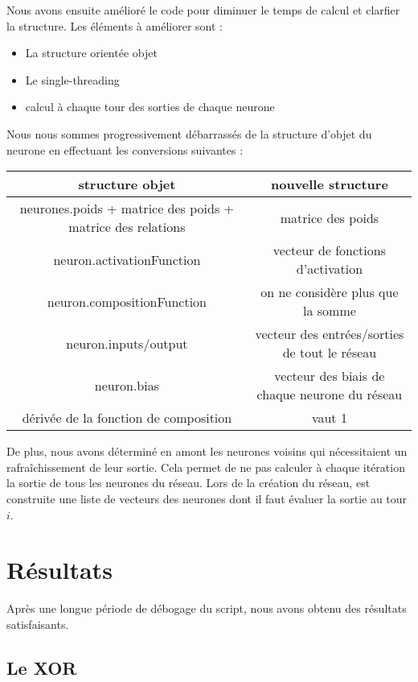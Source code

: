 Nous avons ensuite amélioré le code pour diminuer le temps de calcul et clarfier
la structure. Les éléments à améliorer sont :
\begin{itemize}
\item La structure orientée objet
\item Le single-threading
\item calcul à chaque tour des sorties de chaque neurone
\end{itemize}

\medskip

Nous nous sommes progressivement débarrassés de la structure d'objet du neurone
en effectuant les conversions suivantes :

\medskip

\begin{tabular}{c|c}
   structure objet & nouvelle structure \\
   \hline
   neurones.poids + matrice des poids + matrice des relations & matrice des poids \\
   neuron.activationFunction & vecteur de fonctions d'activation \\
   neuron.compositionFunction & on ne considère plus que la somme \\
   neuron.inputs/output & vecteur des entrées/sorties de tout le réseau \\
   neuron.bias & vecteur des biais de chaque neurone du réseau \\
   dérivée de la fonction de composition & vaut 1
\end{tabular}

\medskip

De plus, nous avons déterminé en amont les neurones voisins qui nécessitaient
un rafraîchissement de leur sortie. Cela permet de ne pas calculer à chaque
itération la sortie de tous les neurones du réseau. Lors de la création du
réseau, est construite une liste de vecteurs des neurones dont il faut évaluer
la sortie au tour $i$.

\section{Résultats}

Après une longue période de débogage du script, nous avons obtenu des résultats
satisfaisants.

\subsection{Le XOR}

